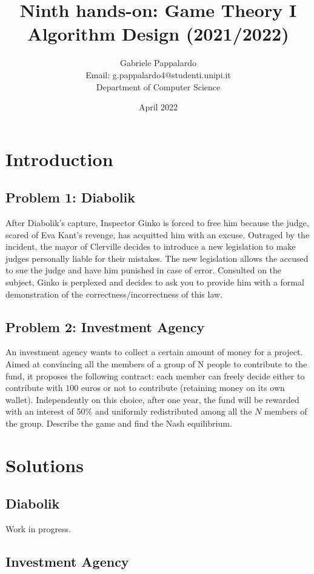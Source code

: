 \documentclass{article}
\title{Ninth hands-on: Game Theory I\\[1ex] \large Algorithm Design (2021/2022)}
\author{Gabriele Pappalardo\\Email: g.pappalardo4@studenti.unipi.it\\Department of Computer Science}
\date{April 2022}
\begin{document}
\maketitle

\section{Introduction}

\subsection{Problem 1: Diabolik}

After Diabolik's capture, Inspector Ginko is forced to free him because the judge, scared of Eva Kant's revenge, has acquitted him with an excuse. 
Outraged by the incident, the mayor of Clerville decides to introduce a new legislation to make judges personally liable for their mistakes. 
The new legislation allows the accused to sue the judge and have him punished in case of error. Consulted on the subject, 
Ginko is perplexed and decides to ask you to provide him with a formal demonstration of the correctness/incorrectness of this law. 


\subsection{Problem 2: Investment Agency}

An investment agency wants to collect a certain amount of money for a project. Aimed at convincing all the members of a group of N people 
to contribute to the fund, it proposes the following contract: each member can freely decide either to contribute with $100$ euros or not 
to contribute (retaining money on its own wallet). Independently on this choice, after one year, the fund will be rewarded with an interest of 50\% 
and uniformly redistributed among all the $N$ members of the group. Describe the game and find the Nash equilibrium. 

\section{Solutions}

\subsection{Diabolik}

Work in progress.

\subsection{Investment Agency}
\end{document}
